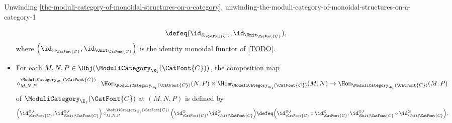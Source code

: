 \begin{remark}{Unwinding \cref{the-moduli-category-of-monoidal-structures-on-a-category}, \rmI}{unwinding-the-moduli-category-of-monoidal-structures-on-a-category-1}
\begin{itemize}
\[                \defeq
                (\id_{\otimes_{\CatFont{C}}},\id_{\Unit_{\CatFont{C}}}),%
            \]%
            where $\Big(\id_{\otimes_{\CatFont{C}}},\id_{\Unit_{\CatFont{C}}}\Big)$ is the identity monoidal functor of \cref{TODO}.
        \item{}For each $M,N,P\in\Obj(\ModuliCategory_{\E_{1}}(\CatFont{C}))$, the composition map
            \[
                \circ^{\ModuliCategory_{\E_{1}}(\CatFont{C})}_{M,N,P}%
                \colon%
                \Hom_{\ModuliCategory_{\E_{1}}(\CatFont{C})}(N,P)%
                \times%
                \Hom_{\ModuliCategory_{\E_{1}}(\CatFont{C})}(M,N)%
                \to%
                \Hom_{\ModuliCategory_{\E_{1}}(\CatFont{C})}(M,P)%
            \]%
            of $\ModuliCategory_{\E_{1}}(\CatFont{C})$ at $(M,N,P)$ is defined by
            \[
                \Big(\id^{\otimes,\prime}_{\CatFont{C}},\id^{\otimes,\prime}_{\Unit|\CatFont{C}}\Big)%
                \mathbin{\circ^{\ModuliCategory_{\E_{1}}(\CatFont{C})}_{M,N,P}}%
                \Big(\id^{\otimes}_{\CatFont{C}},\id^{\otimes}_{\Unit|\CatFont{C}}\Big)%
                \defeq
                \Big(\id^{\otimes,\prime}_{\CatFont{C}}\circ\id^{\otimes}_{\CatFont{C}},\id^{\otimes,\prime}_{\Unit|\CatFont{C}}\circ\id^{\otimes}_{\Unit|\CatFont{C}}\Big).%
            \]%
    \end{itemize}
\end{remark}
